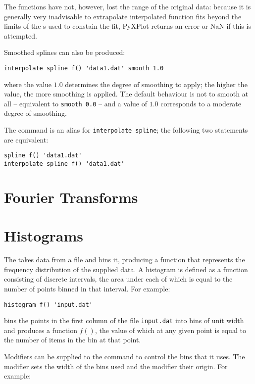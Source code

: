 The functions have not, however, lost the range of the original data: because
it is generally very inadvisable to extrapolate interpolated function fits
beyond the limits of the \datapoint s used to constain the fit, PyXPlot returns
an error or NaN if this is attempted.

Smoothed splines can also be produced:

\begin{verbatim}
interpolate spline f() 'data1.dat' smooth 1.0
\end{verbatim}

\noindent where the value $1.0$ determines the degree of smoothing to apply;
the higher the value, the more smoothing is applied. The default behaviour is
not to smooth at all -- equivalent to {\tt smooth 0.0} -- and a value of $1.0$
corresponds to a moderate degree of smoothing.

The  command is an alias for {\tt interpolate spline}; the
following two statements are equivalent:

\begin{verbatim}
spline f() 'data1.dat'
interpolate spline f() 'data1.dat'
\end{verbatim}

\section{Fourier Transforms}

\section{Histograms}

The  takes data from a file and bins it, producing a
function that represents the frequency distribution of the supplied data.  A
histogram is defined as a function consisting of discrete intervals, the area
under each of which is equal to the number of points binned in that interval.
For example:

\begin{verbatim}
histogram f() 'input.dat'
\end{verbatim}

\noindent bins the points in the first column of the file {\tt input.dat}
into bins of unit width and produces a function $f()$, the value of which at any
given point is equal to the number of items in the bin at that point.

Modifiers can be supplied to the  command to control the bins
that it uses.  The  modifier sets the width of the bins used
and the  modifier their origin.  For example:

